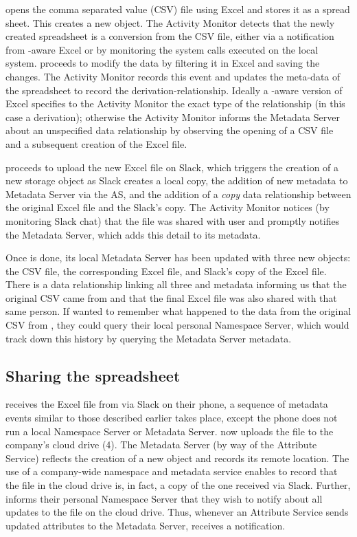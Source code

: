 \persa opens the comma separated value (CSV) file using Excel and stores it as a spread sheet.
This creates a new object. The Activity Monitor detects that the newly created spreadsheet is
a conversion from the CSV file, either via a notification from \system-aware
Excel or by monitoring the system calls executed on the local system. \persa
proceeds to modify the data by filtering it in Excel and saving the changes. The
Activity Monitor records this event and updates the meta-data of the spreadsheet to record the
derivation-relationship. Ideally a \system-aware version of Excel specifies to
the Activity Monitor the exact type of the relationship (in this case a derivation); otherwise
the Activity Monitor informs the Metadata Server about an unspecified data relationship by observing the
opening of a CSV file and a subsequent creation of the Excel file.

\persa proceeds to upload the new Excel file on Slack, which triggers the
creation of a new storage object as Slack creates a local copy, the addition of
new metadata to Metadata Server via the AS, and the addition of a \emph{copy} data relationship
between the original Excel file and the Slack’s copy. The Activity Monitor notices (by
monitoring Slack chat) that the file was shared with user \persc and promptly
notifies the Metadata Server, which adds this detail to its metadata.

Once \persa is done, its local Metadata Server has been updated with three new objects: the
CSV file, the corresponding Excel file, and Slack’s copy of the Excel file.
There is a data relationship linking all three and metadata informing us
that the original CSV came from \persc and that the final Excel file was also
shared with that same person. If \persa wanted to remember what happened to
the data from the original CSV from \persc, they could query their local
personal Namespace Server, which would track down this history by querying the Metadata Server metadata.

\subsection{Sharing the spreadsheet}

\persc receives the Excel file from \persa via Slack on their phone, a
sequence of metadata events similar to those described earlier takes place,
except the phone does not run a local Namespace Server or Metadata Server. \persc now uploads the file to
the company's cloud drive (4). The Metadata Server (by way of the Attribute Service) reflects the creation of a
new object and records its remote location. The use of a company-wide namespace
and metadata service enables \system to record that the file in the cloud drive
is, in fact, a copy of the one received via Slack.  Further, \persc informs
their personal Namespace Server that they wish to notify \persa about all updates to the file
on the cloud drive. Thus, whenever an Attribute Service sends updated attributes to the Metadata Server,
\persc receives a notification.

